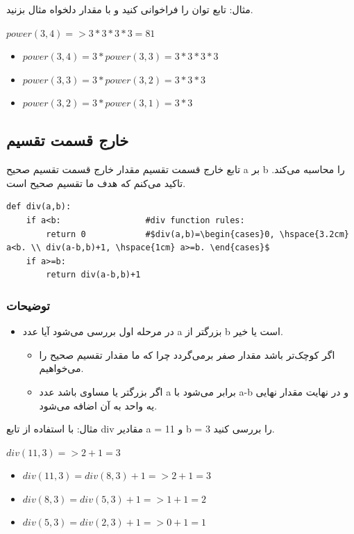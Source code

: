 \documentclass[a4paper]{article}
\begin{document}
مثال: تابع توان را فراخوانی کنید و با مقدار دلخواه مثال بزنید.

\begin{LTR}
\(power(3,4)=> 3*3*3*3=81\)
\begin{itemize}
\item \(power(3,4)= 3*power(3,3)=3*3*3*3\)
\item \(power(3,3)= 3*power(3,2)=3*3*3\)
\item \(power(3,2)= 3*power(3,1)=3*3\)
\end{itemize}
\end{LTR}


\subsection{خارج قسمت تقسیم}
\label{sec:org9e5526c}
تابع خارج قسمت تقسیم مقدار خارج قسمت تقسیم صحیح a بر b را محاسبه می‌کند.
تاکید می‌کنم که هدف ما تقسیم صحیح است.

\begin{verbatim}
def div(a,b):
    if a<b:                 #div function rules:
        return 0            #$div(a,b)=\begin{cases}0, \hspace{3.2cm} a<b. \\ div(a-b,b)+1, \hspace{1cm} a>=b. \end{cases}$
    if a>=b:
        return div(a-b,b)+1
\end{verbatim}

\subsubsection{توضیحات}
\label{sec:org00ab421}
\begin{itemize}
\item در مرحله اول بررسی می‌شود آیا عدد a بزرگتر از b است یا خیر.
\begin{itemize}
\item اگر کوچک‌تر باشد مقدار صفر برمی‌گردد چرا که ما مقدار تقسیم صحیح را می‌خواهیم.
\item اگر بزرگتر یا مساوی باشد عدد a برابر می‌شود با a-b و در نهایت مقدار نهایی یه واحد به آن اضافه می‌شود.
\end{itemize}
\end{itemize}

مثال: با استفاده از تابع div مقادیر a = 11 و b = 3 را بررسی کنید.

\begin{LTR}
\(div(11,3)=> 2+1=3\)
\begin{itemize}
\item \(div(11,3)= div(8,3)+1 => 2+1=3\)
\item \(div(8,3)=  div(5,3)+1 => 1+1=2\)
\item \(div(5,3)=  div(2,3)+1 => 0+1=1\)
\end{itemize}
\end{LTR}
\end{document}
